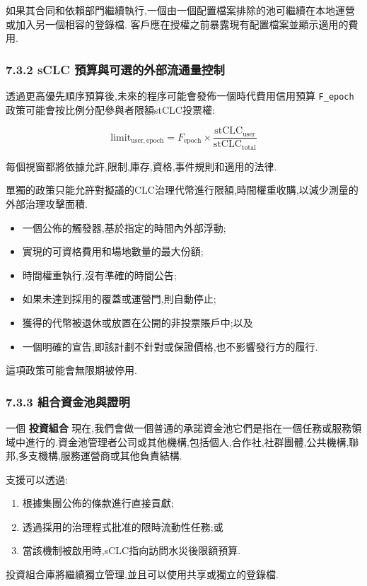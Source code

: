 \documentclass[11pt]{article}
\begin{document}
如果其合同和依賴部門繼續執行,一個由一個配置檔案排除的池可繼續在本地運營或加入另一個相容的登錄檔. 客戶應在授權之前暴露現有配置檔案並顯示適用的費用.

\subsubsection*{7.3.2 sCLC 預算與可選的外部流通量控制}

透過更高優先順序預算後,未來的程序可能會發佈一個時代費用信用預算 \texttt{F\_epoch} 政策可能會按比例分配參與者限額stCLC投票權:

\[
\mathrm{limit}_{\mathrm{user,epoch}} = F_{\mathrm{epoch}} \times \frac{\mathrm{stCLC}_{\mathrm{user}}}{\mathrm{stCLC}_{\mathrm{total}}}
\]

每個視窗都將依據允許,限制,庫存,資格,事件規則和適用的法律.

單獨的政策只能允許對擬議的CLC治理代幣進行限額,時間權重收購,以減少測量的外部治理攻擊面積.

\begin{itemize}[leftmargin=*]
\item 一個公佈的觸發器,基於指定的時間內外部浮動;
\item 實現的可資格費用和場地數量的最大份額;
\item 時間權重執行,沒有準確的時間公告;
\item 如果未達到採用的覆蓋或運營門,則自動停止;
\item 獲得的代幣被退休或放置在公開的非投票賬戶中;以及
\item 一個明確的宣告,即該計劃不針對或保證價格,也不影響發行方的履行.
\end{itemize}
這項政策可能會無限期被停用.

\subsubsection*{7.3.3 組合資金池與證明}

一個 \textbf{投資組合} 現在,我們會做一個普通的承諾資金池它們是指在一個任務或服務領域中進行的.資金池管理者公司或其他機構,包括個人,合作社,社群團體,公共機構,聯邦,多支機構,服務運營商或其他負責結構.

支援可以透過:

\begin{enumerate}[leftmargin=*]
\item 根據集團公佈的條款進行直接貢獻;
\item 透過採用的治理程式批准的限時流動性任務;或
\item 當該機制被啟用時,sCLC指向訪問水災後限額預算.
\end{enumerate}
投資組合庫將繼續獨立管理,並且可以使用共享或獨立的登錄檔.
\end{document}
